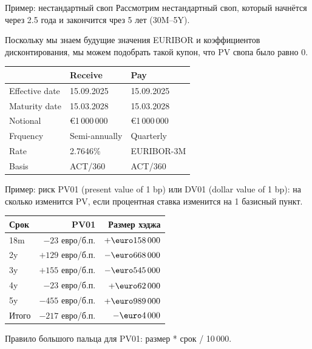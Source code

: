 \documentclass{beamer}
\renewcommand{\EUR}[1]{\textup{\euro}#1}
\begin{document}
\begin{frame}{Пример: нестандартный своп}
\justify
Рассмотрим нестандартный своп, который начнётся через 2.5 года и закончится чрез 5 лет 
(30M--5Y).

\justify
Поскольку мы знаем будущие значения EURIBOR и коэффициентов дисконтирования, мы можем 
подобрать такой купон, что PV свопа было равно 0.

\justify
\centering
\begin{tabular}{l|l|l}
& Receive & Pay \\ \hline
Effective date & 15.09.2025 & 15.09.2025 \\ 
Maturity date  & 15.03.2028 & 15.03.2028 \\
Notional       & \EUR{1\,000\,000} & \EUR{1\,000\,000} \\
Frquency       & Semi-annually     & Quarterly \\
Rate           & \alert{2.7646\%}          & EURIBOR-3M   \\
Basis          & ACT/360           & ACT/360
\end{tabular}
\end{frame}



\begin{frame}{Пример: риск}
\justify
PV01 (present value of 1 bp) или DV01 (dollar value of 1 bp): на сколько изменится
PV, если процентная ставка изменится на 1 базисный пункт.

\justify
\centering
\begin{tabular}{l|r|r}
Срок  & PV01 & Размер хэджа \\ \hline
18m   & $-23$  евро/б.п. & $+\EUR{158\,000}$ \\
2y    & $+129$ евро/б.п. & $-\EUR{668\,000}$ \\
3y    & $+155$ евро/б.п. & $-\EUR{545\,000}$ \\
4y    & $-23$  евро/б.п. & $+\EUR{62\,000}$ \\
5y    & $-455$ евро/б.п. & $+\EUR{989\,000}$ \\ \hline
Итого & $-217$ евро/б.п. & $-\EUR{4\,000}$
\end{tabular}

\justify
Правило большого пальца для PV01: размер * срок / 10\,000.
\end{frame}
\end{document}
